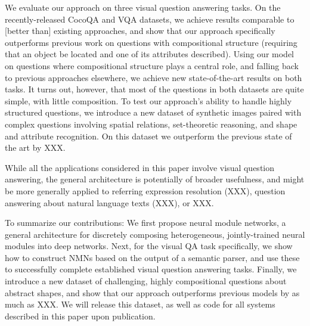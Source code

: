 
We evaluate our approach on three visual question answering tasks. On the
recently-released CocoQA \cite{yu15arxiv} and  VQA \cite{antol15iccv} datasets,
we achieve results comparable to [better than] existing approaches, and show
that our approach specifically outperforms previous work on questions with
compositional structure (\eg requiring that an object be located and one of its
attributes described). Using our model on questions where compositional
structure plays a central role, and falling back to previous approaches
elsewhere, we achieve new state-of-the-art results on both tasks. It turns out,
however, that most of the questions in both datasets are quite simple, with
little composition. To test our approach's ability to handle highly structured
questions, we introduce a new dataset of synthetic images paired with complex
questions involving spatial relations, set-theoretic reasoning, and shape and
attribute recognition. On this dataset we outperform the previous state of the
art by XXX.

While all the applications considered in this paper involve visual question
answering, the general architecture is potentially of broader usefulness, and
might be more generally applied to referring expression resolution (XXX),
question answering about natural language texts (XXX), or XXX.


To summarize our contributions: We first propose neural module networks, a
general architecture for discretely composing heterogeneous, jointly-trained
neural modules into deep networks. Next, for the visual QA task specifically, we
show how to construct NMNs based on the output of a semantic parser, and use
these to successfully complete established visual question answering tasks.
Finally, we introduce a new dataset of challenging, highly compositional
questions about abstract shapes, and show that our approach outperforms previous
models by as much as XXX. We will release this dataset, as well as code for all
systems described in this paper upon publication.
